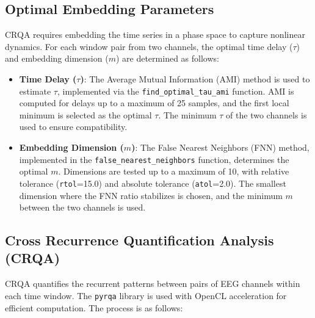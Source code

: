 \documentclass{article}
\begin{document}
				\subsection{Optimal Embedding Parameters}
				\label{subsec:embedding_parameters}

				CRQA requires embedding the time series in a phase space to capture nonlinear dynamics. For each window pair from two channels, the optimal time delay (\(\tau\)) and embedding dimension (\(m\)) are determined as follows:

				\begin{itemize}
				    \item \textbf{Time Delay (\(\tau\))}: The Average Mutual Information (AMI) method is used to estimate \(\tau\), implemented via the \texttt{find\_optimal\_tau\_ami} function. AMI is computed for delays up to a maximum of 25 samples, and the first local minimum is selected as the optimal \(\tau\). The minimum \(\tau\) of the two channels is used to ensure compatibility.
				    \item \textbf{Embedding Dimension (\(m\))}: The False Nearest Neighbors (FNN) method, implemented in the \texttt{false\_nearest\_neighbors} function, determines the optimal \(m\). Dimensions are tested up to a maximum of 10, with relative tolerance (\texttt{rtol}=15.0) and absolute tolerance (\texttt{atol}=2.0). The smallest dimension where the FNN ratio stabilizes is chosen, and the minimum \(m\) between the two channels is used.
				\end{itemize}

				\subsection{Cross Recurrence Quantification Analysis (CRQA)}
				\label{subsec:crqa}

				CRQA quantifies the recurrent patterns between pairs of EEG channels within each time window. The \texttt{pyrqa} library is used with OpenCL acceleration for efficient computation. The process is as follows:
\end{document}
